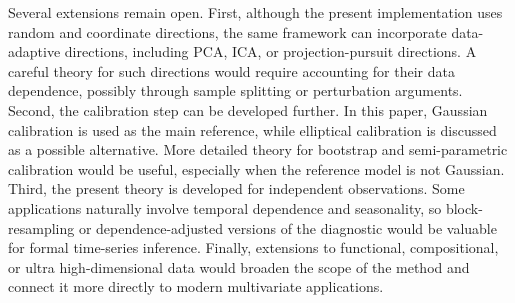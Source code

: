 \documentclass[11pt]{article}
\theoremstyle{plain}
\theoremstyle{definition}
\theoremstyle{remark}
\begin{document}
Several extensions remain open. First, although the present implementation uses random and coordinate directions, the same framework can incorporate data-adaptive directions, including PCA, ICA, or projection-pursuit directions. A careful theory for such directions would require accounting for their data dependence, possibly through sample splitting or perturbation arguments. Second, the calibration step can be developed further. In this paper, Gaussian calibration is used as the main reference, while elliptical calibration is discussed as a possible alternative. More detailed theory for bootstrap and semi-parametric calibration would be useful, especially when the reference model is not Gaussian. Third, the present theory is developed for independent observations. Some applications naturally involve temporal dependence and seasonality, so block-resampling or dependence-adjusted versions of the diagnostic would be valuable for formal time-series inference. Finally, extensions to functional, compositional, or ultra high-dimensional data would broaden the scope of the method and connect it more directly to modern multivariate applications.




\end{document}
